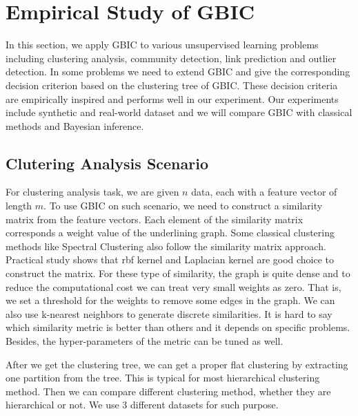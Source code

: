 \section{Empirical Study of GBIC}\label{sec:es}
In this section, we apply GBIC to various unsupervised learning problems including clustering analysis, community detection, link prediction and outlier detection.
In some problems we need to extend GBIC and give the corresponding decision criterion based on the clustering tree of GBIC.
These decision criteria are empirically inspired and performs well in our experiment. Our experiments
include synthetic and real-world dataset and we will compare GBIC with classical methods and Bayesian inference.

\subsection{Clutering Analysis Scenario}\label{subsec:dc}
For clustering analysis task, we are given $n$ data, each with a feature vector of length $m$.
To use GBIC on such scenario, we need to construct a similarity matrix from the feature vectors. Each element of the similarity matrix corresponds a weight value of the underlining graph. Some classical clustering methods like Spectral Clustering also follow the similarity matrix approach. Practical study shows that rbf kernel and Laplacian kernel are good choice to construct the matrix.
For these type of similarity, the graph is quite dense and to reduce the computational cost we can treat very small weights as zero. That is, we set a threshold for the weights to remove some edges in the graph. We can also use k-nearest neighbors to generate discrete similarities. It is hard to say which similarity metric is better than others and it depends on specific problems. Besides, the hyper-parameters of the metric can be tuned as well.

After we get the clustering tree, we can get a proper flat clustering by extracting one partition from the tree. This is typical for most hierarchical clustering method. Then we can compare different clustering method, whether they are hierarchical or not. We use 3 different datasets for such purpose.

